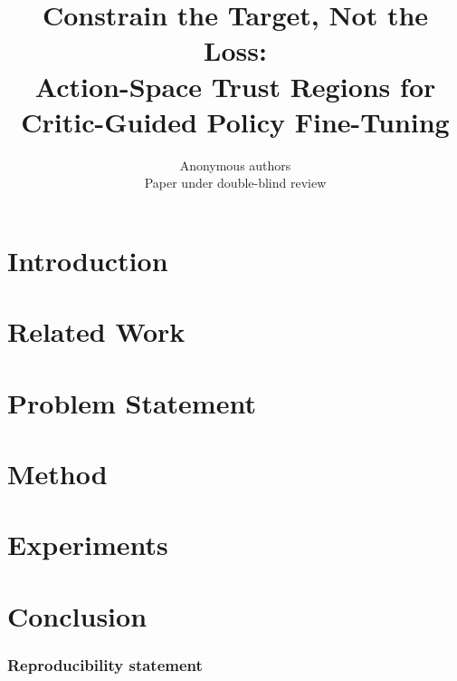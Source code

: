 \documentclass{article} %
\title{Constrain the Target, Not the Loss: \\
Action-Space Trust Regions for Critic-Guided Policy Fine-Tuning}
\author{Anonymous authors\\
Paper under double-blind review}
\begin{document}
\maketitle

\begin{abstract}

\end{abstract}

\section{Introduction}
\label{sec:introduction}


\section{Related Work}
\label{sec:related-work}


\section{Problem Statement}
\label{sec:problem-statement}


\section{Method}
\label{sec:method}


\section{Experiments}
\label{sec:experiments}


\section{Conclusion}
\label{sec:conclusion}


\subsubsection*{Reproducibility statement}





\appendix

\end{document}
